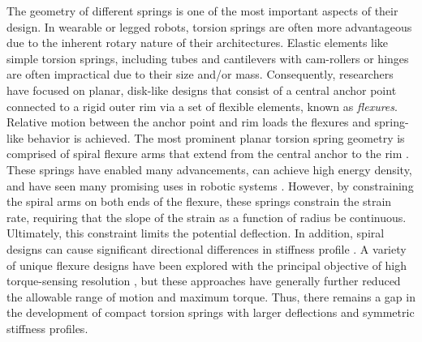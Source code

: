 \documentclass[letterpaper, 10 pt, conference]{ieeeconf} %
\begin{document}
The geometry of different springs is one of the most important aspects of their design. In wearable or legged robots, torsion springs are often more advantageous due to the inherent rotary nature of their architectures. Elastic elements like simple torsion springs, including tubes \cite{Williamson1999Dissertation,Pratt2002ICB} and cantilevers with cam-rollers \cite{ShepherdRouse2017} or hinges \cite{HubickiGrimes2016} are often impractical due to their size and/or mass. Consequently, researchers have focused on planar, disk-like designs that consist of a central anchor point connected to a rigid outer rim via a set of flexible elements, known as \textit{flexures}. Relative motion between the anchor point and rim loads the flexures and spring-like behavior is achieved. The most prominent planar torsion spring geometry is comprised of spiral flexure arms that extend from the central anchor to the rim \cite{KnoxSchmiedeler2009JMD,Stienen2010TBME,LagodaEA2010ICBRB,WangMeijnekeVanderkooij2013ICORR,GeorgievBurdick2017IROS,YooChungMech2017}. These springs have enabled many advancements, can achieve high energy density, and have seen many promising uses in robotic systems \cite{WangVanderkooij2015NSRE,Chaichaowarat2018EMBS,PaineOhSentis2014TMech,BrownNesnas2018IROS}. However, by constraining the spiral arms on both ends of the flexure, these springs constrain the strain rate, requiring that the slope of the strain as a function of radius be continuous. Ultimately, this constraint limits the potential deflection. In addition, spiral designs can cause significant directional differences in stiffness profile \cite{YooChungMech2017}. A variety of unique flexure designs have been explored with the principal objective of high torque-sensing resolution \cite{CarpinoEA2012JMD,PaineEA2015JFR,AccotoEA2013IJARS,DossantosCurinSiqueira2017CEP,KimKong2021,FioreziAndrade2020,CummingsSup2016}, but these approaches have generally further reduced the allowable range of motion and maximum torque. Thus, there remains a gap in the development of compact torsion springs with larger deflections and symmetric stiffness profiles.  
\end{document}
